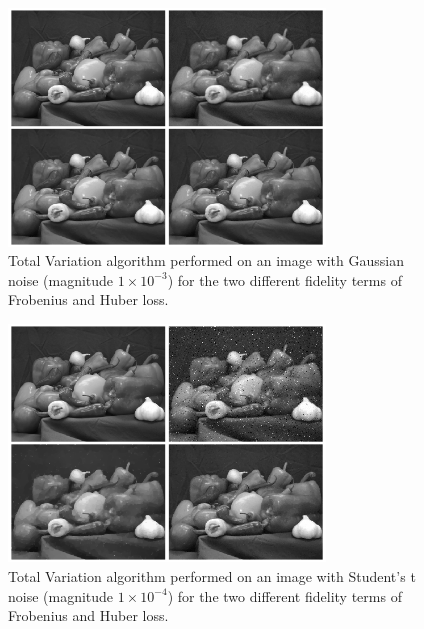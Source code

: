 \documentclass[10pt,a4paper]{article}
\begin{document}
\begin{figure}[H]
\begin{center}
\includegraphics[width = 0.75\textwidth]{../figures/gaussian_peppers.png} 
\end{center}
\caption{Total Variation algorithm performed on an image with Gaussian noise (magnitude $1 \times 10^{-3}$) for the two different fidelity terms of Frobenius and Huber loss.}
\label{tv_gauss}
\end{figure}

\begin{figure}[H]
\begin{center}
\includegraphics[width = 0.75\textwidth]{../figures/student-t_peppers.png} 
\end{center}
\caption{Total Variation algorithm performed on an image with Student's t noise (magnitude $1 \times 10^{-4}$) for the two different fidelity terms of Frobenius and Huber loss.}
\label{tv_student}
\end{figure}
\end{document}
